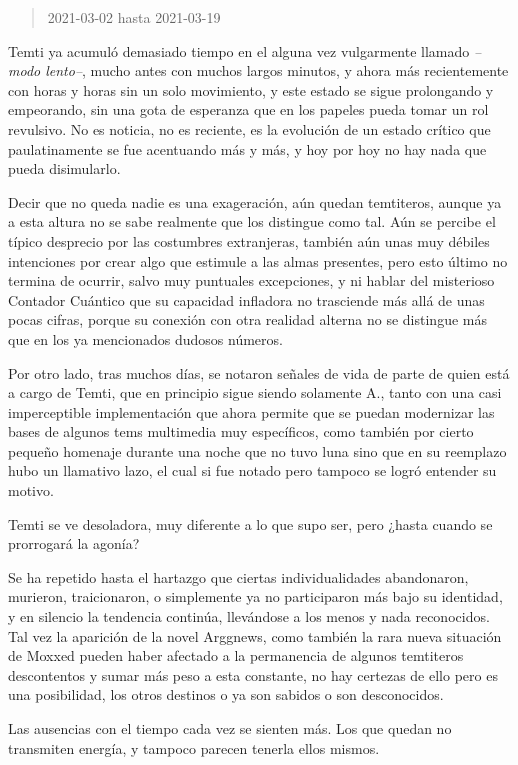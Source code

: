 \documentclass[
  spanish,
]{book}
\begin{document}
\begin{quote}
2021-03-02 hasta 2021-03-19
\end{quote}

Temti ya acumuló demasiado tiempo en el alguna vez vulgarmente llamado \emph{--modo lento--}, mucho antes con muchos largos minutos, y ahora más recientemente con horas y horas sin un solo movimiento, y este estado se sigue prolongando y empeorando, sin una gota de esperanza que en los papeles pueda tomar un rol revulsivo. No es noticia, no es reciente, es la evolución de un estado crítico que paulatinamente se fue acentuando más y más, y hoy por hoy no hay nada que pueda disimularlo.

Decir que no queda nadie es una exageración, aún quedan temtiteros, aunque ya a esta altura no se sabe realmente que los distingue como tal. Aún se percibe el típico desprecio por las costumbres extranjeras, también aún unas muy débiles intenciones por crear algo que estimule a las almas presentes, pero esto último no termina de ocurrir, salvo muy puntuales excepciones, y ni hablar del misterioso Contador Cuántico que su capacidad infladora no trasciende más allá de unas pocas cifras, porque su conexión con otra realidad alterna no se distingue más que en los ya mencionados dudosos números.

Por otro lado, tras muchos días, se notaron señales de vida de parte de quien está a cargo de Temti, que en principio sigue siendo solamente A., tanto con una casi imperceptible implementación que ahora permite que se puedan modernizar las bases de algunos tems multimedia muy específicos, como también por cierto pequeño homenaje durante una noche que no tuvo luna sino que en su reemplazo hubo un llamativo lazo, el cual si fue notado pero tampoco se logró entender su motivo.

Temti se ve desoladora, muy diferente a lo que supo ser, pero ¿hasta cuando se prorrogará la agonía?

Se ha repetido hasta el hartazgo que ciertas individualidades abandonaron, murieron, traicionaron, o simplemente ya no participaron más bajo su identidad, y en silencio la tendencia continúa, llevándose a los menos y nada reconocidos. Tal vez la aparición de la novel Arggnews, como también la rara nueva situación de Moxxed pueden haber afectado a la permanencia de algunos temtiteros descontentos y sumar más peso a esta constante, no hay certezas de ello pero es una posibilidad, los otros destinos o ya son sabidos o son desconocidos.

Las ausencias con el tiempo cada vez se sienten más.
Los que quedan no transmiten energía, y tampoco parecen tenerla ellos mismos.
\end{document}
